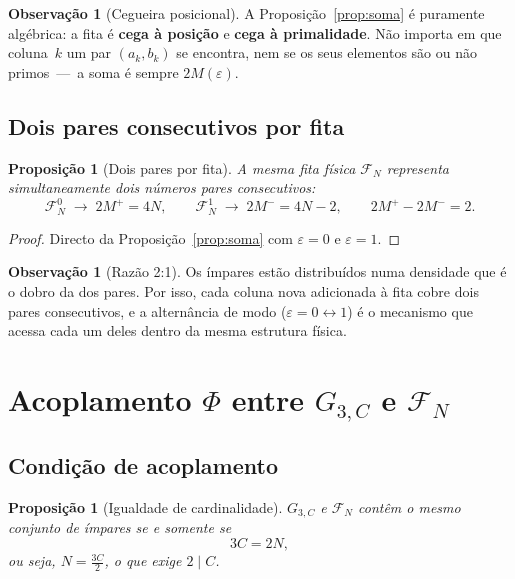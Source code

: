 \documentclass[12pt, a4paper]{article}
\theoremstyle{plain}
\newtheorem{proposition}[theorem]{Proposição}
\theoremstyle{definition}
\newtheorem{remark}[theorem]{Observação}
\theoremstyle{remark}
\begin{document}
	\begin{remark}[Cegueira posicional]
		A Proposição~\ref{prop:soma} é puramente algébrica: a fita é
		\textbf{cega à posição} e \textbf{cega à primalidade}.  Não
		importa em que coluna~$k$ um par $(a_k,b_k)$ se encontra, nem se
		os seus elementos são ou não primos~---~a soma é sempre
		$2M(\varepsilon)$.
	\end{remark}
	
	\subsection{Dois pares consecutivos por fita}
	
	\begin{proposition}[Dois pares por fita]
		\label{prop:dois}
		A mesma fita física $\mathcal{F}_N$ representa simultaneamente
		dois números pares consecutivos:
		\[
		\mathcal{F}_N^0 \;\longrightarrow\; 2M^+ = 4N,
		\qquad
		\mathcal{F}_N^1 \;\longrightarrow\; 2M^- = 4N-2,
		\qquad
		2M^+ - 2M^- = 2.
		\]
	\end{proposition}
	
	\begin{proof}
		Directo da Proposição~\ref{prop:soma} com $\varepsilon=0$ e
		$\varepsilon=1$.
	\end{proof}
	
	\begin{remark}[Razão 2:1]
		Os ímpares estão distribuídos numa densidade que é o dobro da dos
		pares.  Por isso, cada coluna nova adicionada à fita cobre dois
		pares consecutivos, e a alternância de modo
		($\varepsilon=0\leftrightarrow1$) é o mecanismo que acessa cada
		um deles dentro da mesma estrutura física.
	\end{remark}
	
	\section{Acoplamento $\Phi$ entre $G_{3,C}$ e $\mathcal{F}_N$}
	\label{sec:phi}
	
	\subsection{Condição de acoplamento}
	
	\begin{proposition}[Igualdade de cardinalidade]
		\label{prop:card}
		$G_{3,C}$ e $\mathcal{F}_N$ contêm o mesmo conjunto de ímpares
		se e somente se
		\[
		3C = 2N,
		\]
		ou seja, $N=\frac{3C}{2}$, o que exige $2\mid C$.
	\end{proposition}
	
\end{document}
